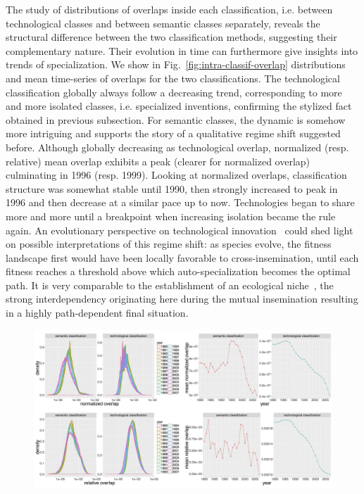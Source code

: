 The study of distributions of overlaps inside each classification, i.e. between technological classes and between semantic classes separately, reveals the structural difference between the two classification methods, suggesting their complementary nature. Their evolution in time can furthermore give insights into trends of specialization. We show in Fig.~\ref{fig:intra-classif-overlap} distributions and mean time-series of overlaps for the two classifications. The technological classification globally always follow a decreasing trend, corresponding to more and more isolated classes, i.e. specialized inventions, confirming the stylized fact obtained in previous subsection. For semantic classes, the dynamic is somehow more intriguing and supports the story of a qualitative regime shift suggested before. Although globally decreasing as technological overlap, normalized (resp. relative) mean overlap exhibits a peak (clearer for normalized overlap) culminating in 1996 (resp. 1999). Looking at normalized overlaps, classification structure was somewhat stable until 1990, then strongly increased to peak in 1996 and then decrease at a similar pace up to now. Technologies began to share more and more until a breakpoint when increasing isolation became the rule again. An evolutionary perspective on technological innovation~\cite{ziman2003technological} could shed light on possible interpretations of this regime shift: as species evolve, the fitness landscape first would have been locally favorable to cross-insemination, until each fitness reaches a threshold above which auto-specialization becomes the optimal path. It is very comparable to the establishment of an ecological niche~\cite{holland2012signals}, the strong interdependency originating here during the mutual insemination resulting in a highly path-dependent final situation. 



\begin{figure}[!ht]
\centering
\includegraphics[width=\linewidth]{Figures/Final/C-patentsmining-intra-classif-overlap.jpg}
\label{fig:patentsmining:intra-classif-overlap}
\end{figure}



